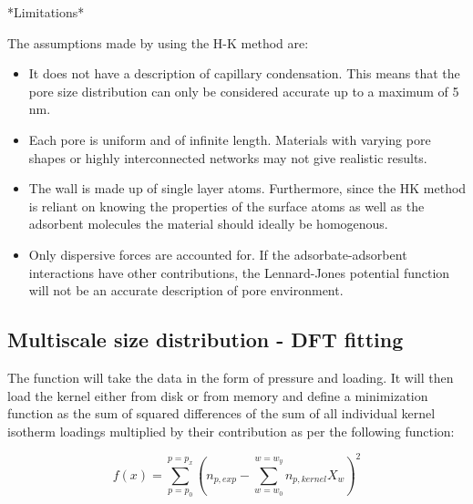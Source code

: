 *Limitations*

The assumptions made by using the H-K method are:

\begin{itemize}
    
    \item It does not have a description of capillary condensation. This means that the
    pore size distribution can only be considered accurate up to a maximum of 5 nm.
    \item Each pore is uniform and of infinite length. Materials with varying pore
    shapes or highly interconnected networks may not give realistic results.
    \item The wall is made up of single layer atoms. Furthermore, since the HK method
    is reliant on knowing the properties of the surface atoms as well as the
    adsorbent molecules the material should ideally be homogenous.
    \item Only dispersive forces are accounted for. If the adsorbate-adsorbent interactions
    have other contributions, the Lennard-Jones potential function will not be
    an accurate description of pore environment.
    
\end{itemize}

\subsection{Multiscale size distribution - DFT fitting}

The function will take the data in the form of pressure and loading. It will
then load the kernel either from disk or from memory and define a minimization
function as the sum of squared differences of the sum of all individual kernel
isotherm loadings multiplied by their contribution as per the following function:

\begin{equation}
    f(x) = \sum_{p=p_0}^{p=p_x} (n_{p,exp} - \sum_{w=w_0}^{w=w_y} n_{p, kernel} X_w )^2
\end{equation}